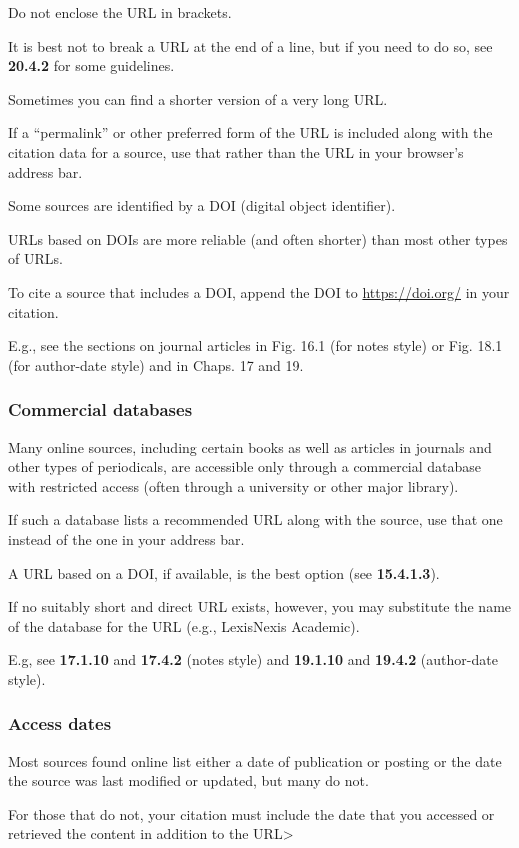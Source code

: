 \documentclass[oneside]{book}
\numberwithin{equation}{section}
\begin{document}
Do not enclose the URL in brackets.

It is best not to break a URL at the end of a line, but if you need to do so, see \textbf{20.4.2} for some guidelines.

%
Sometimes you can find a shorter version of a very long URL.

If a ``permalink'' or other preferred form of the URL is included along with the citation data for a source, use that rather than the URL in your browser's address bar.

Some sources are identified by a DOI (digital object identifier).

URLs based on DOIs are more reliable (and often shorter) than most other types of URLs.

To cite a source that includes a DOI, append the DOI to \url{https://doi.org/} in your citation.

E.g., see the sections on journal articles in Fig. 16.1 (for notes style) or Fig. 18.1 (for author-date style) and in Chaps. 17 and 19.

\subsubsection{Commercial databases}
Many online sources, including certain books as well as articles in journals and other types of periodicals, are accessible only through a commercial database with restricted access (often through a university or other major library).

If such a database lists a recommended URL along with the source, use that one instead of the one in your address bar.

A URL based on a DOI, if available, is the best option (see \textbf{15.4.1.3}).

If no suitably short and direct URL exists, however, you may substitute the name of the database for the URL (e.g., LexisNexis Academic).

E.g, see \textbf{17.1.10} and \textbf{17.4.2} (notes style) and \textbf{19.1.10} and \textbf{19.4.2} (author-date style).

\subsubsection{Access dates}
Most sources found online list either a date of publication or posting or the date the source was last modified or updated, but many do not.

For those that do not, your citation must include the date that you accessed or retrieved the content in addition to the URL>
\end{document}
